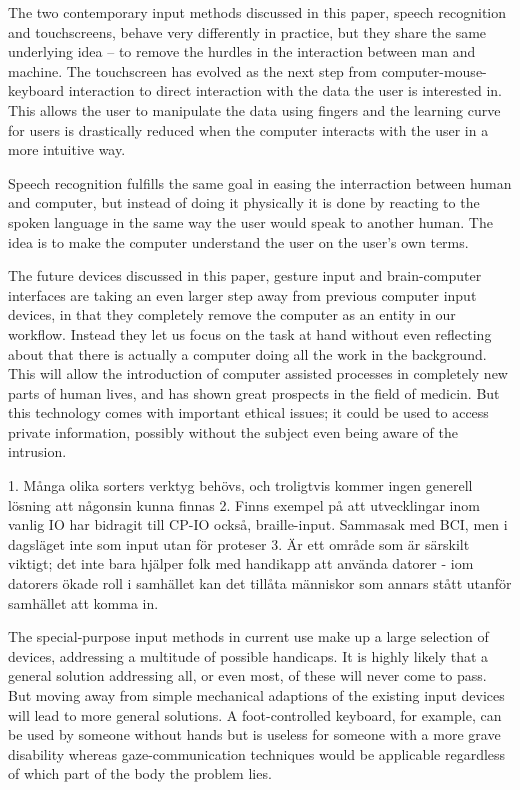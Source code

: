 
The two contemporary input methods discussed in this paper, speech recognition and touchscreens, behave very differently in practice, but they share the same underlying idea -- to remove the hurdles in the interaction between man and machine. The touchscreen has evolved as the next step from computer-mouse-keyboard interaction to direct interaction with the data the user is interested in. This allows the user to manipulate the data using fingers and the learning curve for users is drastically reduced when the computer interacts with the user in a more intuitive way.

Speech recognition fulfills the same goal in easing the interraction between human and computer, but instead of doing it physically it is done by reacting to the spoken language in the same way the user would speak to another human. The idea is to make the computer understand the user on the user's own terms.


The future devices discussed in this paper, gesture input and brain-computer interfaces are taking an even larger step away from previous computer input devices, in that they completely remove the computer as an entity in our workflow. Instead they let us focus on the task at hand without even reflecting about that there is actually a computer doing all the work in the background. This will allow the introduction of computer assisted processes in completely new parts of human lives, and has shown great prospects in the field of medicin. But this technology comes with important ethical issues; it could be used to access private information, possibly without the subject even being aware of the intrusion.


1. Många olika sorters verktyg behövs, och troligtvis kommer ingen generell lösning att någonsin kunna finnas
2. Finns exempel på att utvecklingar inom vanlig IO har bidragit till CP-IO också, braille-input. Sammasak med BCI, men i dagsläget inte som input utan för proteser
3. Är ett område som är särskilt viktigt; det inte bara hjälper folk med handikapp att använda datorer - iom datorers ökade roll i samhället kan det tillåta människor som annars stått utanför samhället att komma in.

The special-purpose input methods in current use make up a large selection of devices, addressing a multitude of possible handicaps. It is highly likely that a general solution addressing all, or even most, of these will never come to pass. But moving away from simple mechanical adaptions of the existing input devices will lead to more general solutions. A foot-controlled keyboard, for example, can be used by someone without hands but is useless for someone with a more grave disability whereas gaze-communication techniques would be applicable regardless of which part of the body the problem lies.

